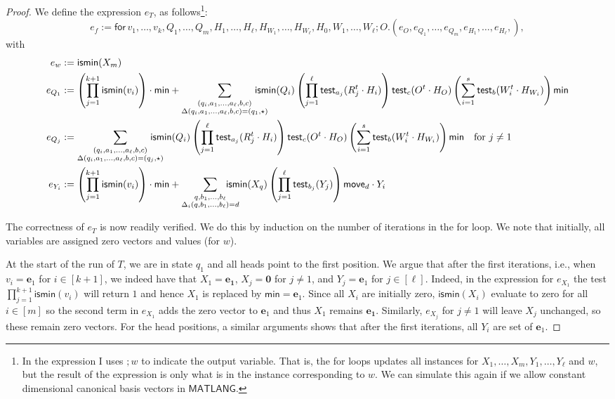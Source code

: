 \begin{proof}
We define the expression $e_T$, as follows\footnote{In the expression I uses $;w$ to indicate the output variable. That is, the for loops updates all instances for $X_1,\ldots,X_m,Y_1,\ldots,Y_\ell$ and $w$, but the result of the expression is only what is in the instance corresponding to $w$. We can simulate this again if we allow constant dimensional canonical basis vectors in $\mathsf{MATLANG}$.}:
$$
e_f:= \mathsf{for\,} v_1,\ldots,v_{k},Q_1,\ldots,Q_m,H_1,\ldots,H_\ell,H_{W_1},\ldots,H_{W_\ell},H_0, W_1,\ldots,W_\ell; O.(e_O,e_{Q_1},\ldots,e_{Q_m},e_{H_1},\ldots,e_{H_\ell},),
$$
with 
\begin{align*}\allowdisplaybreaks
	e_w&:=\mathsf{ismin}(X_m)\\
	e_{Q_1}&:=\left(\prod_{j=1}^{k+1} \textsf{ismin}(v_i)\right)\cdot\mathsf{min}
	+ \sum_{\substack{(q_i,a_1,\ldots,a_\ell,b,c)\\
	\Delta(q_i,a_1,\ldots,a_\ell,b,c)=(q_1,\star)}} \!\!\!\!\!\!\!\!\! \textsf{ismin}(Q_i)\left(\prod_{j=1}^\ell \mathsf{test}_{a_j}(R_j^t\cdot H_i)\right)\mathsf{test}_{c}(O^t\cdot H_O)
	\left(\sum_{i=1}^s \mathsf{test}_{b}(W_i^t\cdot H_{W_i})\right)\mathsf{min}\\
	e_{Q_j}&:=\sum_{\substack{(q_i,a_1,\ldots,a_\ell,b,c)\\
	\Delta(q_i,a_1,\ldots,a_\ell,b,c)=(q_j,\star)}} \!\!\!\!\!\!\!\!\! \textsf{ismin}(Q_i)\left(\prod_{j=1}^\ell \mathsf{test}_{a_j}(R_j^t\cdot H_i)\right)\mathsf{test}_{c}(O^t\cdot H_O)
	\left(\sum_{i=1}^s \mathsf{test}_{b}(W_i^t\cdot H_{W_i})\right)\mathsf{min}
	 \quad \text{for $j\neq 1$}\\
	e_{Y_i}&:=\left(\prod_{j=1}^{k+1} \textsf{ismin}(v_i)\right)\cdot\mathsf{min}
	+\sum_{\substack{q,b_1,\ldots,b_\ell\\
	\Delta_i(q,b_1,\ldots,b_\ell)=d}}\!\!\!\!\!\!\!\!\! \textsf{ismin}(X_q)\left(\prod_{j=1}^\ell \mathsf{test}_{b_j}(Y_j)\right)\mathsf{move}_d\cdot Y_i
\end{align*}

The correctness of $e_T$ is now readily verified. We do this by induction on the number of iterations in the for loop. We note that initially, all variables are assigned zero vectors and values (for $w$). 

At the start of the run of $T$, we are in state $q_1$ and all heads point to the first position. We argue that after the first 
iterations, i.e., when $v_i=\mathbf{e}_1$ for $i\in[k+1]$, we indeed have that $X_1=\mathbf{e_1}$, $X_j=\mathbf{0}$ for $j\neq 1$, and $Y_j=\mathbf{e}_1$ for $j\in[\ell]$. Indeed, in the expression for $e_{X_1}$ the test $\prod_{j=1}^{k+1} \textsf{ismin}(v_i)$ will return $1$ and hence $X_1$ is replaced by $\mathsf{min}=\mathbf{e}_1$. Since all $X_i$ are initially zero, $\mathsf{ismin}(X_i)$ evaluate to zero for all $i\in[m]$ so the second term in $e_{X_1}$ adds the zero vector to $\mathbf{e}_1$ and thus $X_1$ remains $\mathbf{e_1}$.
Similarly, $e_{X_j}$ for $j\neq 1$ will leave $X_j$ unchanged, so these remain zero vectors. For the head positions, a similar arguments shows that after the first iterations, all $Y_i$ are set of $\mathbf{e}_1$.


\end{proof}
